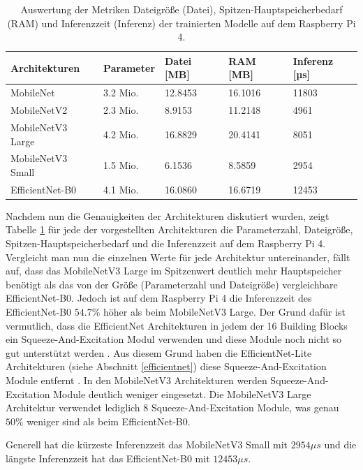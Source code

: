 \begin{table}[ht]
\centering
\begin{tabular}{lllll}
\toprule
    Architekturen & Parameter &  Datei [MB] &  RAM [MB] &  Inferenz [µs] \\
\midrule
        MobileNet &  3.2 Mio. &     12.8453 &   16.1016 &          11803 \\
      MobileNetV2 &  2.3 Mio. &      8.9153 &   11.2148 &           4961 \\
MobileNetV3 Large &  4.2 Mio. &     16.8829 &   20.4141 &           8051 \\
MobileNetV3 Small &  1.5 Mio. &      6.1536 &    8.5859 &           2954 \\
  EfficientNet-B0 &  4.1 Mio. &     16.0860 &   16.6719 &          12453 \\
\bottomrule
\end{tabular}
\caption{Auswertung der Metriken Dateigröße (Datei), Spitzen-Hauptspeicherbedarf (RAM) und Inferenzzeit (Inferenz) der trainierten Modelle auf dem Raspberry Pi 4.}
\label{t4.2}
\end{table}

Nachdem nun die Genauigkeiten der Architekturen diskutiert wurden, zeigt Tabelle \ref{t4.2} für jede der vorgestellten Architekturen die Parameterzahl, Dateigröße, Spitzen-Hauptspeicherbedarf und die Inferenzzeit auf dem Raspberry Pi 4. Vergleicht man nun die einzelnen Werte für jede Architektur untereinander, fällt auf, dass das MobileNetV3 Large im Spitzenwert deutlich mehr Hauptspeicher benötigt als das von der Größe (Parameterzahl und Dateigröße) vergleichbare EfficientNet-B0. Jedoch ist auf dem Raspberry Pi 4 die Inferenzzeit des EfficientNet-B0 $54.7\%$ höher als beim MobileNetV3 Large. Der Grund dafür ist vermutlich, dass die EfficientNet Architekturen in jedem der 16 Building Blocks ein Squeeze-And-Excitation Modul verwenden \cite{tan_efficientnet_2020} und diese Module noch nicht so gut unterstützt werden \cite{liu_higher_2020}. Aus diesem Grund haben die EfficientNet-Lite Architekturen (siehe Abschnitt \ref{efficientnet}) diese Squeeze-And-Excitation Module entfernt \cite{liu_higher_2020}. In den MobileNetV3 Architekturen werden Squeeze-And-Excitation Module deutlich weniger eingesetzt. Die MobileNetV3 Large Architektur verwendet lediglich 8 Squeeze-And-Excitation Module, was genau $50\%$ weniger sind als beim EfficientNet-B0.

Generell hat die kürzeste Inferenzzeit das MobileNetV3 Small mit $2954 \mu s$ und die längste Inferenzzeit hat das EfficientNet-B0 mit $12453 \mu s$.

